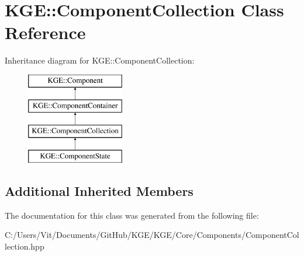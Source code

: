 \hypertarget{class_k_g_e_1_1_component_collection}{\section{K\-G\-E\-:\-:Component\-Collection Class Reference}
\label{class_k_g_e_1_1_component_collection}
}
Inheritance diagram for K\-G\-E\-:\-:Component\-Collection\-:\begin{figure}[H]
\begin{center}
\leavevmode
\includegraphics[height=4.000000cm]{class_k_g_e_1_1_component_collection}
\end{center}
\end{figure}
\subsection*{Additional Inherited Members}


The documentation for this class was generated from the following file\-:\begin{DoxyCompactItemize}
\item 
C\-:/\-Users/\-Vit/\-Documents/\-Git\-Hub/\-K\-G\-E/\-K\-G\-E/\-Core/\-Components/Component\-Collection.\-hpp\end{DoxyCompactItemize}
